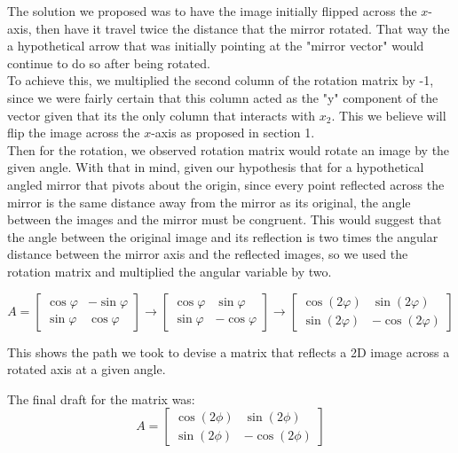\documentclass{ximera}
\begin{document}
\begin{enumerate}
The solution we proposed was to have the image initially flipped across the $x$-axis, then have it travel twice the distance that the mirror rotated. That way the a hypothetical arrow that was initially pointing at the "mirror vector" would continue to do so after being rotated.\\

To achieve this, we multiplied the second column of the rotation matrix by -1, since we were fairly certain that this column acted as the "y" component of the vector given that its the only column that interacts with $x_2$. This we believe will flip the image across the $x$-axis as proposed in section 1.\\

Then for the rotation, we observed rotation matrix would rotate an image by the given angle. With that in mind, given our hypothesis that for a hypothetical angled mirror that pivots about the origin, since every point reflected across the mirror is the same distance away from the mirror as its original, the angle between the images and the mirror must be congruent. This would suggest that the angle between the original image and its reflection is two times the angular distance between the mirror axis and the reflected images, so we used the rotation matrix and multiplied the angular variable by two.

$$A = \left[\begin{array}{cc}
\cos\varphi & -\sin\varphi \\ \sin\varphi & \cos\varphi \end{array}\right] \rightarrow  \left[\begin{array}{cc}
\cos\varphi & \sin\varphi \\ \sin\varphi & -\cos\varphi \end{array}\right]\rightarrow
\left[\begin{array}{cc}
\cos(2\varphi) & \sin(2\varphi) \\ \sin(2\varphi) & -\cos(2\varphi) \end{array}\right]$$ 

This shows the path we took to devise a matrix that reflects a 2D image across a rotated axis at a given angle. 

 The final draft for the matrix was:
     $$A = \left[\begin{array}{cc}
\cos(2\phi) & \sin(2\phi) \\ \sin(2\phi) & -\cos(2\phi) \end{array}\right]$$

\end{enumerate}
\end{document}
